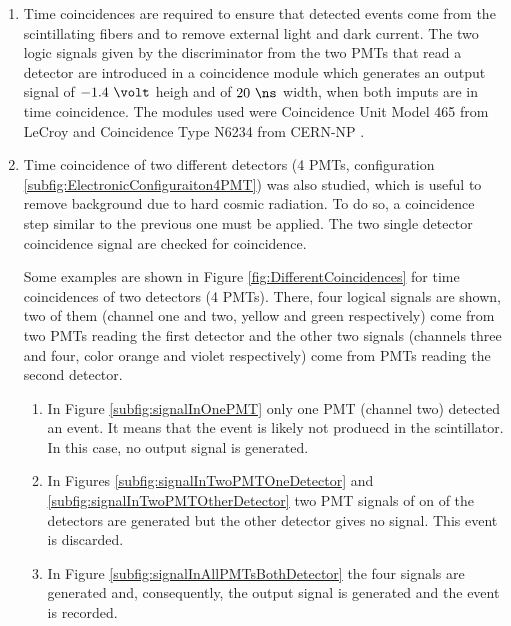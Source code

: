 \begin{enumerate}
\begin{enumerate}
\item{} Time coincidences are required to ensure that detected events come from the scintillating fibers and to remove external light and dark current. The two logic signals given by the discriminator from the two PMTs that read a detector are introduced in a coincidence module which generates an output signal of $-1.4~\volt$ heigh and of $20~\ns$ width, when both imputs are in time coincidence. The modules used were Coincidence Unit Model 465 from LeCroy \cite{DataSheetCoincidenceLeCroy} and Coincidence Type N6234 from CERN-NP \cite{DataSheetCoincidenceCERN}.

\item{} Time coincidence of two different detectors (4 PMTs, configuration \ref{subfig:ElectronicConfiguraiton4PMT}) was also studied, which is useful to remove background due to hard cosmic radiation. To do so, a coincidence step similar to the previous one must be applied. The two single detector coincidence signal are checked for coincidence.

Some examples are shown in Figure \ref{fig:DifferentCoincidences} for time coincidences of two detectors (4 PMTs). There, four logical signals are shown, two of them (channel one and two, yellow and green respectively) come from two PMTs reading the first detector and the other two signals (channels three and four, color orange and violet respectively) come from PMTs reading the second detector.

\begin{enumerate}
\item{} In Figure \ref{subfig:signalInOnePMT} only one PMT (channel two) detected an event. It means that the event is likely not produecd in the scintillator. In this case, no output signal is generated.

\item{} In Figures \ref{subfig:signalInTwoPMTOneDetector} and \ref{subfig:signalInTwoPMTOtherDetector} two PMT signals of on of the detectors are generated but the other detector gives no signal. This event is discarded.

\item{} In Figure \ref{subfig:signalInAllPMTsBothDetector} the four signals are generated and, consequently, the output signal is generated and the event is recorded.


\end{enumerate}
\end{enumerate}
\end{enumerate}
